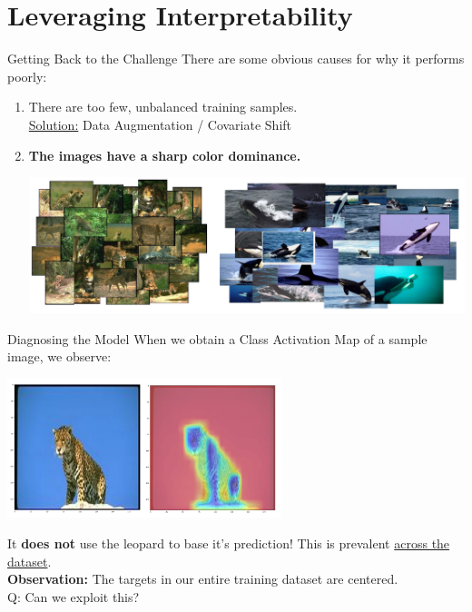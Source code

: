 \documentclass{beamer}
\begin{document}
\section{Leveraging Interpretability}
\begin{frame}{Getting Back to the Challenge}
	There are some obvious causes for why it performs poorly:
	\begin{enumerate}[label=\alph*.]
		\item There are too few, unbalanced training samples. \pause \\
			\underline{Solution:} Data Augmentation / Covariate Shift \pause
		\item \textbf{The images have a sharp color dominance.} \pause
			\begin{center}
				\vspace{-1em}
				\hspace*{-2em}  
				\includegraphics[width=\textwidth]{img/dataset.pdf}
			\end{center}
	\end{enumerate}
\end{frame}

\begin{frame}{Diagnosing the Model}
	When we obtain a Class Activation Map of a sample image, we observe:
	\begin{center}
		\vspace{-.8em}
		\includegraphics[width=8cm]{img/bad-cam}
	\end{center} \pause
	\vspace{-1em}
	It \textbf{does not} use the leopard to base it's prediction!
	This is prevalent \underline{across the dataset}. \pause \newline \\

	\textbf{Observation:} The targets in our entire training dataset are centered. \pause \newline \\

	Q: Can we exploit this?
\end{frame}
\end{document}
